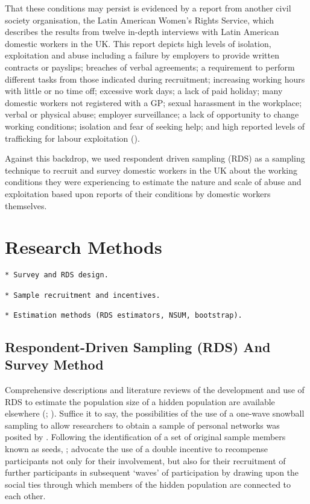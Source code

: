 \documentclass[
  12pt,
  letterpaper,
  DIV=11,
  numbers=noendperiod]{scrartcl}
\theoremstyle{plain}
\theoremstyle{definition}
\begin{document}
That these conditions may persist is evidenced by a report from another
civil society organisation, the Latin American Women's Rights Service,
which describes the results from twelve in-depth interviews with Latin
American domestic workers in the UK. This report depicts high levels of
isolation, exploitation and abuse including a failure by employers to
provide written contracts or payslips; breaches of verbal agreements; a
requirement to perform different tasks from those indicated during
recruitment; increasing working hours with little or no time off;
excessive work days; a lack of paid holiday; many domestic workers not
registered with a GP; sexual harassment in the workplace; verbal or
physical abuse; employer surveillance; a lack of opportunity to change
working conditions; isolation and fear of seeking help; and high
reported levels of trafficking for labour exploitation
(\textcite{latin_american_womens_rights_service_behind_2023}).

Against this backdrop, we used respondent driven sampling (RDS) as a
sampling technique to recruit and survey domestic workers in the UK
about the working conditions they were experiencing to estimate the
nature and scale of abuse and exploitation based upon reports of their
conditions by domestic workers themselves.

\section{Research Methods}\label{research-methods}

\begin{verbatim}
* Survey and RDS design.
    
* Sample recruitment and incentives.
    
* Estimation methods (RDS estimators, NSUM, bootstrap).
\end{verbatim}

\subsection{Respondent-Driven Sampling (RDS) And Survey
Method}\label{respondent-driven-sampling-rds-and-survey-method}

Comprehensive descriptions and literature reviews of the development and
use of RDS to estimate the population size of a hidden population are
available elsewhere (\textcite{heckathorn_comment_2011};
\textcite{gile_methods_2018}). Suffice it to say, the possibilities of
the use of a one-wave snowball sampling to allow researchers to obtain a
sample of personal networks was posited by
\textcite{frank_estimating_1994}. Following the identification of a set
of original sample members known as seeds,
\textcite{heckathorn_respondent-driven_1997};
\textcite{heckathorn_respondent-driven_2002} advocate the use of a
double incentive to recompense participants not only for their
involvement, but also for their recruitment of further participants in
subsequent `waves' of participation by drawing upon the social ties
through which members of the hidden population are connected to each
other.
\end{document}
